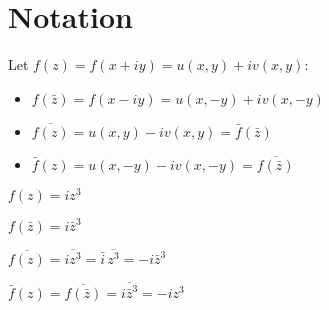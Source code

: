 \documentclass[letterpaper,12pt,fleqn]{article}
\newcommand{\conj}[1]{\bar{#1}}
\newcommand{\Conj}[1]{\overline{#1}}
\begin{document}
\section*{Notation}

Let $f(z)=f(x+iy)=u(x,y)+iv(x,y)$:
\begin{itemize}
\item $f(\conj{z})=f(x-iy)=u(x,-y)+iv(x,-y)$
\item $\Conj{f(z)}=u(x,y)-iv(x,y)=\conj{f}(\conj{z})$
\item $\conj{f}(z)=u(x,-y)-iv(x,-y)=\Conj{f(\conj{z})}$
\end{itemize}

\begin{example}
  $f(z)=iz^3$

  $f(\conj{z})=i\conj{z}^3$

  $\Conj{f(z)}=\Conj{iz^3}=\conj{i}\,\Conj{z^3}=-i\conj{z}^3$

  $\conj{f}(z)=\Conj{f(\conj{z})}=\Conj{i\conj{z}^3}=-iz^3$
\end{example}
\end{document}
